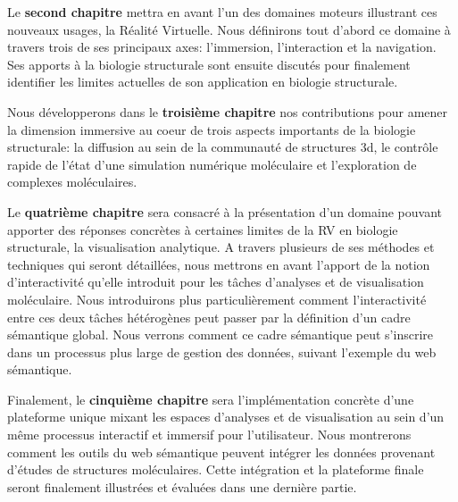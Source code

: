 Le \textbf{second chapitre} mettra en avant l'un des domaines moteurs illustrant ces nouveaux usages, la Réalité Virtuelle. Nous définirons tout d'abord ce domaine à travers trois de ses principaux axes: l'immersion, l'interaction et la navigation. Ses apports à la biologie structurale sont ensuite discutés pour finalement identifier les limites actuelles de son application en biologie structurale.

Nous développerons dans le \textbf{troisième chapitre} nos contributions pour amener la dimension immersive au coeur de trois aspects importants de la biologie structurale: la diffusion au sein de la communauté de structures 3d, le contrôle rapide de l'état d'une simulation numérique moléculaire et l'exploration de complexes moléculaires.

Le \textbf{quatrième chapitre} sera consacré à la présentation d'un domaine pouvant apporter des réponses concrètes à certaines limites de la RV en biologie structurale, la visualisation analytique. A travers plusieurs de ses méthodes et techniques qui seront détaillées, nous mettrons en avant l'apport de la notion d'interactivité qu'elle introduit pour les tâches d'analyses et de visualisation moléculaire. Nous introduirons plus particulièrement comment l'interactivité entre ces deux tâches hétérogènes peut passer par la définition d'un cadre sémantique global. Nous verrons comment ce cadre sémantique peut s'inscrire dans un processus plus large de gestion des données, suivant l'exemple du web sémantique.

Finalement, le \textbf{cinquième chapitre} sera l'implémentation concrète d'une plateforme unique mixant les espaces d'analyses et de visualisation au sein d'un même processus interactif et immersif pour l'utilisateur. Nous montrerons comment les outils du web sémantique peuvent intégrer les données provenant d'études de structures moléculaires. Cette intégration et la plateforme finale seront finalement illustrées et évaluées dans une dernière partie.